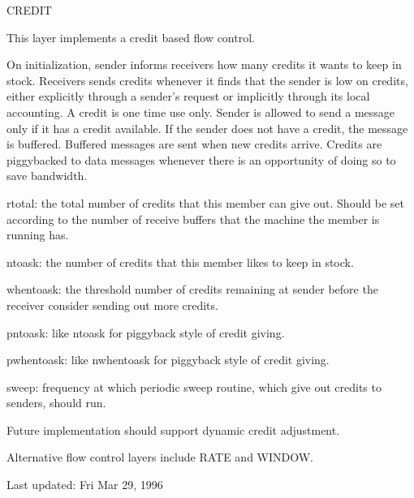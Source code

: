 %
%
%
\begin{Layer}{CREDIT}

This layer implements a credit based flow control.

\begin{Protocol}
On initialization, sender informs receivers how many credits it wants to
keep in stock.  Receivers sends credits whenever it finds that the sender
is low on credits, either explicitly through a sender's request or
implicitly through its local accounting.  A credit is one time use only.
Sender is allowed to send a message only if it has a credit available.  If
the sender does not have a credit, the message is buffered.  Buffered
messages are sent when new credits arrive.  Credits are piggybacked to data
messages whenever there is an opportunity of doing so to save bandwidth.
\end{Protocol}

\begin{Parameters}
\item 
rtotal: the total number of credits that this member can give out.  Should
be set according to the number of receive buffers that the machine the
member is running has.
\item 
ntoask: the number of credits that this member likes to keep in stock.
\item 
whentoask: the threshold number of credits remaining at sender before the
receiver consider sending out more credits.
\item 
pntoask: like ntoask for piggyback style of credit giving.
\item 
pwhentoask: like nwhentoask for piggyback style of credit giving.
\item 
sweep: frequency at which periodic sweep routine, which give out credits to
senders, should run.
\end{Parameters}


\begin{Notes}
\item Future implementation should support dynamic credit adjustment.
\item Alternative flow control layers include RATE and WINDOW.
\end{Notes}

\begin{Sources}
\end{Sources}

Last updated: Fri Mar 29, 1996

\end{Layer}
